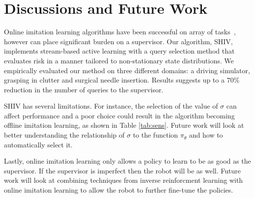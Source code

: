 \documentclass[10pt, conference]{ieeeconf}      %
\begin{document}
\section{Discussions and Future Work}
Online imitation learning algorithms have been successful on array of tasks~\cite{NIPS2014_5421,ross2010reduction}, however can place significant burden on a supervisor. Our algorithm, SHIV, implements stream-based active learning with a query selection method that evaluates risk in a manner tailored to non-stationary state distributions. We empirically evaluated our method on three different domains: a driving simulator, grasping in clutter and surgical needle insertion. Results suggests up to a $70\%$ reduction in the number of queries to the supervisor. 

SHIV has several limitations. For instance, the selection of the value of $\sigma$ can affect performance and a poor choice could result in the algorithm becoming offline imitation learning, as shown in Table \ref{tab:sens}. Future work will look at better understanding the relationship of $\sigma$ to the function $\pi_{\theta}$ and how to automatically select it. 

 Lastly, online imitation learning only allows a policy to learn to be as good as the supervisor. If the supervisor is imperfect then the robot will be as well. Future work will look at combining techniques from inverse reinforcment learning\cite{argall2009survey} with online imitation learning to allow the robot to further fine-tune the policies.  
 






\end{document}
